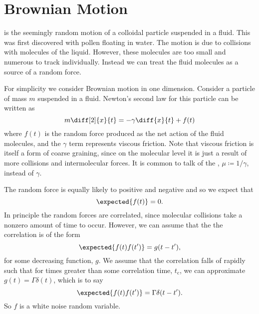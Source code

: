\documentclass[fleqn]{NotesClass}
\begin{document}
    \section{Brownian Motion}
     is the seemingly random motion of a colloidal particle suspended in a fluid.
    This was first discovered with pollen floating in water.
    The motion is due to collisions with molecules of the liquid.
    However, these molecules are too small and numerous to track individually.
    Instead we can treat the fluid molecules as a source of a random force.
    
    For simplicity we consider Brownian motion in one dimension.
    Consider a particle of mass \(m\) suspended in a fluid.
    Newton's second law for this particle can be written as
    \begin{equation}
        m\diff[2]{x}{t} = -\gamma\diff{x}{t} + f(t)
    \end{equation}
    where \(f(t)\) is the random force produced as the net action of the fluid molecules, and the \(\gamma\) term represents viscous friction.
    Note that viscous friction is itself a form of coarse graining, since on the molecular level it is just a result of more collisions and intermolecular forces.
    It is common to talk of the , \(\mu \coloneqq 1/\gamma\), instead of \(\gamma\).
    
    The random force is equally likely to positive and negative and so we expect that
    \begin{equation}
        \expected{f(t)} = 0.
    \end{equation}
    In principle the random forces are correlated, since molecular collisions take a nonzero amount of time to occur.
    However, we can assume that the the correlation is of the form
    \begin{equation}
        \expected{f(t)f(t')} = g(t - t'),
    \end{equation}
    for some decreasing function, \(g\).
    We assume that the correlation falls of rapidly such that for times greater than some correlation time, \(t_{\mathrm{c}}\), we can approximate \(g(t) = \Gamma\delta(t)\), which is to say
    \begin{equation}
        \expected{f(t)f(t')} = \Gamma \delta(t - t').
    \end{equation}
    So \(f\) is a white noise random variable.
    
\end{document}

